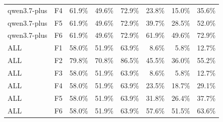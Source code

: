 \begin{tabular}{llrrrrrr}
qwen3.7-plus & F4 & 61.9\% & 49.6\% & 72.9\% & 23.8\% & 15.0\% & 35.6\% \\
qwen3.7-plus & F5 & 61.9\% & 49.6\% & 72.9\% & 39.7\% & 28.5\% & 52.0\% \\
qwen3.7-plus & F6 & 61.9\% & 49.6\% & 72.9\% & 61.9\% & 49.6\% & 72.9\% \\
ALL & F1 & 58.0\% & 51.9\% & 63.9\% & 8.6\% & 5.8\% & 12.7\% \\
ALL & F2 & 79.8\% & 70.8\% & 86.5\% & 45.5\% & 36.0\% & 55.2\% \\
ALL & F3 & 58.0\% & 51.9\% & 63.9\% & 8.6\% & 5.8\% & 12.7\% \\
ALL & F4 & 58.0\% & 51.9\% & 63.9\% & 23.5\% & 18.7\% & 29.1\% \\
ALL & F5 & 58.0\% & 51.9\% & 63.9\% & 31.8\% & 26.4\% & 37.7\% \\
ALL & F6 & 58.0\% & 51.9\% & 63.9\% & 57.6\% & 51.5\% & 63.6\% \\
\bottomrule
\end{tabular}

